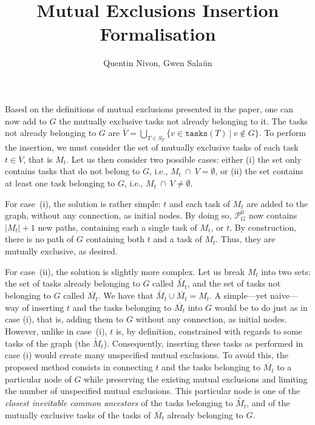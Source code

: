 \documentclass{article}
\title{Mutual Exclusions Insertion Formalisation}
\author{Quentin Nivon, Gwen Sala{\"u}n}
\newcommand{\bpmnpaths}[1]{\mathcal{P}_{#1}^{0}}
\newcommand{\cardof}[1]{\lvert #1 \rvert}
\newcommand{\tasksop}[1]{\ensuremath{\mathtt{tasks}(#1)}}
\begin{document}
	\maketitle
	
	Based on the definitions of mutual exclusions presented in the paper, one can now add to $G$ the mutually exclusive tasks not already belonging to it.
	The tasks not already belonging to $G$ are $\overline{V} = \bigcup\limits_{T \in S_T} \{v \in \tasksop{T}\ \vert\ v \notin G\}$.
	To perform the insertion, we must consider the set of mutually exclusive tasks of each task $t \in \overline{V}$, that is $M_t$.
	Let us then consider two possible cases: either (i) the set only contains tasks that do not belong to $G$, i.e., $M_t \ \cap \ V = \emptyset$, or (ii) the set contains at least one task belonging to $G$, i.e., $M_t \ \cap \ V \neq \emptyset$.
	
	For case~(i), the solution is rather simple: $t$ and each task of $M_t$ are added to the graph, without any connection, as initial nodes.
	By doing so, $\bpmnpaths{G}$ now contains $\cardof{M_t} + 1$ new paths, containing each a single task of $M_t$, or $t$.
	By construction, there is no path of $G$ containing both $t$ and a task of $M_t$.
	Thus, they are mutually exclusive, as desired.
	
	For case~(ii), the solution is slightly more complex.
	Let us break $M_t$ into two sets: the set of tasks already belonging to $G$ called $\tilde{M_t}$, and the set of tasks not belonging to $G$ called $\overline{M_t}$.
	We have that $\tilde{M_t} \cup \overline{M_t} = M_t$.
	A simple---yet naive---way of inserting $t$ and the tasks belonging to $\overline{M_t}$ into $G$ would be to do just as in case (i), that is, adding them to $G$ without any connection, as initial nodes.
	However, unlike in case~(i), $t$ is, by definition, constrained with regards to some tasks of the graph (the $\tilde{M}_t$).
	Consequently, inserting these tasks as performed in case (i) would create many unspecified mutual exclusions.
	To avoid this, the proposed method consists in connecting $t$ and the tasks belonging to $\overline{M_t}$ to a particular node of $G$ while preserving the existing mutual exclusions and limiting the number of unspecified mutual exclusions.
	This particular node is one of the \textit{closest inevitable common ancestors} of the tasks belonging to $\tilde{M_t}$, and of the mutually exclusive tasks of the tasks of $\overline{M_t}$ already belonging to $G$.
	
\end{document}
